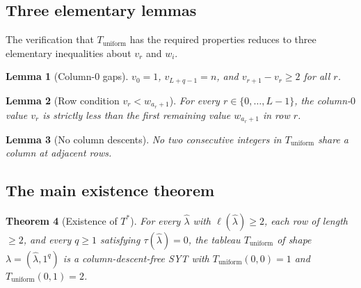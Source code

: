 \documentclass[11pt]{article}
\newtheorem{theorem}{Theorem}[section]
\newtheorem{lemma}[theorem]{Lemma}
\theoremstyle{definition}
\newcommand{\bla}{\widehat\lambda}
\newcommand{\elh}{\ell(\bla)}
\newcommand{\Tstar}{T^{*}}
\newcommand{\Tunif}{T_{\mathrm{uniform}}}
\begin{document}
\subsection{Three elementary lemmas}

The verification that $\Tunif$ has the required properties reduces to three elementary inequalities about $v_r$ and $w_i$.

\begin{lemma}[Column-$0$ gaps]\label{lem:column0-gaps}
$v_0 = 1$, $v_{L+q-1} = n$, and $v_{r+1} - v_r \ge 2$ for all $r$.
\end{lemma}


\begin{lemma}[Row condition $v_r < w_{a_r+1}$]\label{lem:row-condition}
For every $r \in \{0, \ldots, L-1\}$, the column-$0$ value $v_r$ is strictly less than the first remaining value $w_{a_r + 1}$ in row $r$.
\end{lemma}


\begin{lemma}[No column descents]\label{lem:no-col-desc}
No two consecutive integers in $\Tunif$ share a column at adjacent rows.
\end{lemma}


\subsection{The main existence theorem}

\begin{theorem}[Existence of $\Tstar$]\label{thm:existence-Tstar}
For every $\bla$ with $\elh \ge 2$, each row of length $\ge 2$, and every $q \ge 1$ satisfying $\tau(\bla) = 0$, the tableau $\Tunif$ of shape $\lambda = (\bla, 1^q)$ is a column-descent-free SYT with $\Tunif(0,0) = 1$ and $\Tunif(0,1) = 2$.
\end{theorem}
\end{document}
